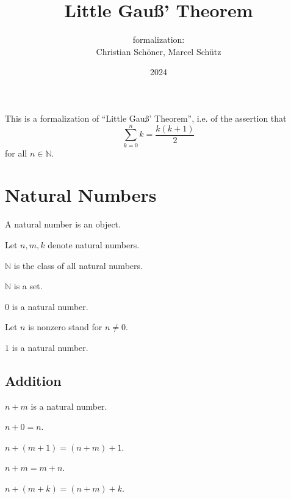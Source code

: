 \documentclass[english]{article}
\title{Little Gauß' Theorem}
\author{\Naproche formalization:\\[0.5em]Christian Schöner, Marcel Schütz}
\date{2024}
\begin{document}
\maketitle

\noindent This is a formalization of ``Little Gauß' Theorem'', i.e. of
the assertion that
\[\sum_{k = 0}^n k = \frac{k(k + 1)}2\]
for all $n \in \mathbb{N}$.

\section{Natural Numbers}

\begin{forthel}

  \begin{signature}
    A natural number is an object.

    Let $n, m, k$ denote natural numbers.
  \end{signature}

  \begin{definition}
    $\mathbb{N}$ is the class of all natural numbers.
  \end{definition}

  \begin{axiom}
    $\mathbb{N}$ is a set.
  \end{axiom}

  \begin{signature}
    $0$ is a natural number.

    Let $n$ is nonzero stand for $n \neq 0$.
  \end{signature}

  \begin{signature}
    $1$ is a natural number.
  \end{signature}
\end{forthel}


\subsection{Addition}

\begin{forthel}
  \begin{signature}
    $n + m$ is a natural number.
  \end{signature}

  \begin{axiom}
    $n + 0 = n$.
  \end{axiom}

  \begin{axiom}
    $n + (m + 1) = (n + m) + 1$.
  \end{axiom}

  \begin{axiom}
    $n + m = m + n$.
  \end{axiom}

  \begin{axiom}
    $n + (m + k) = (n + m) + k$.
  \end{axiom}
\end{forthel}
\end{document}
